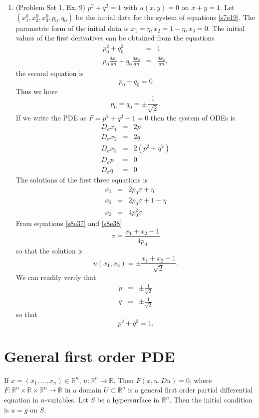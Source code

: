\documentclass{article}
\newcommand{\td}[2]{\frac{d{#1}}{d{#2}}}
\theoremstyle{plain}
\numberwithin{thm}{section}
\theoremstyle{plain}
\numberwithin{prop}{section}
\theoremstyle{definition}
\numberwithin{defn}{section}
\theoremstyle{remark}
\numberwithin{equation}{section}
\begin{document}
\begin{enumerate}
\item (Problem Set 1, Ex. 9) $p^2 + q^2 = 1$ with $u(x, y) = 0$ on $x + y = 1$. Let $(x_1^0, x_2^0, 
x_3^0, p_0, q_0)$ be the initial data for the system of equations \eqref{s7e19}. The parametric
form of the initial data is $x_1 = \eta, x_2 = 1 - \eta, x_3 = 0$. The initial values of the first
derivatives can be obtained from the equations
\begin{eqnarray*}
p_0^2 + q_0^2 &=& 1 \\
p_0\td{x_1}{\eta} + q_0\td{x_2}{\eta} &=& \td{x_3}{\eta},
\end{eqnarray*}
the second equation is
\[
p_0 - q_0 = 0
\]
Thus we have
\begin{equation}\label{s8e31}
p_0 = q_0 = \pm\frac{1}{\sqrt{2}}.
\end{equation}
If we write the PDE as $F = p^2 + q^2 - 1 = 0$ then the system of ODEs is
\begin{eqnarray}
D_\sigma x_1 &=& 2p \label{s8e32} \\
D_\sigma x_2 &=& 2q \label{s8e33} \\
D_\sigma x_3 &=& 2(p^2 + q^2) \label{s8e34} \\
D_\sigma p &=& 0 \label{s8e35} \\
D_\sigma q &=& 0 \label{s8e36}
\end{eqnarray}
The solutions of the first three equations is
\begin{eqnarray}
x_1 &=& 2p_0\sigma + \eta \label{s8e37} \\
x_2 &=& 2p_0\sigma + 1 - \eta \label{s8e38} \\
x_3 &=& 4p_0^2 \sigma \label{s8e39}
\end{eqnarray}
From equations \eqref{s8e37} and \eqref{s8e38}
\[
\sigma = \frac{x_1 + x_2 - 1}{4p_0}
\]
so that the solution is 
\begin{equation}\label{s8e40}
u(x_1, x_2) = \pm\frac{x_1 + x_2 - 1}{\sqrt{2}}.
\end{equation}
We can readily verify that
\begin{eqnarray*}
p &=& \pm\frac{1}{\sqrt{2}} \\
q &=& \pm\frac{1}{\sqrt{2}} 
\end{eqnarray*}
so that
\[
p^2 + q^2 = 1.
\]
\end{enumerate}

\section{General first order PDE}\label{s9}
If $x = (x_1, \ldots, x_n) \in \mathbb{R}^n$, $u: \mathbb{R}^n \rightarrow \mathbb{R}$. Then
$F(x, u, Du) = 0$, where $F:\mathbb{R}^n \times \mathbb{R} \times \mathbb{R}^n \rightarrow \mathbb{R}$ 
in a domain $U \subset \mathbb{R}^n$ is a general first order partial differential equation in 
$n$-variables. Let $S$ be a hypersurface in $\mathbb{R}^n$. Then the initial condition is $u = g$ on $S$. 
\end{document}
